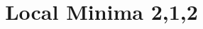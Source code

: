 \documentclass[conference]{IEEEtran}
\begin{document}
\title{Local Minima 2,1,2}






% 


\maketitle
\end{document}
